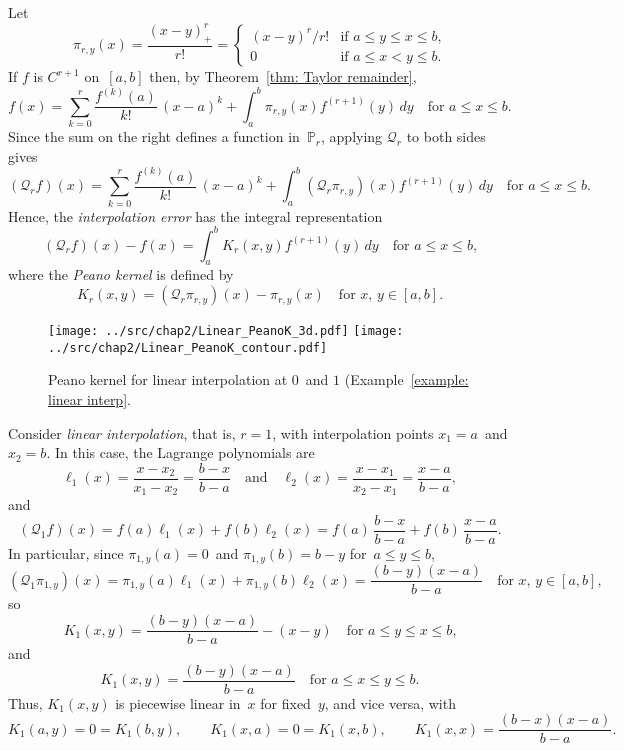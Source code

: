 Let 
\begin{equation}\label{eq: pi r y}
\pi_{r,y}(x)=\frac{(x-y)_+^r}{r!}=\begin{cases}
	(x-y)^r/r!&\text{if $a\le y\le x\le b$,}\\
	0&\text{if $a\le x<y\le b$.}
\end{cases}
\end{equation}
If $f$ is $C^{r+1}$ on~$[a,b]$ then, by Theorem~\ref{thm: Taylor remainder}, 
\[
f(x)=\sum_{k=0}^r\frac{f^{(k)}(a)}{k!}\,(x-a)^k
	+\int_a^b\pi_{r,y}(x)f^{(r+1)}(y)\,dy\quad\text{for $a\le x\le b$.}
\]
Since the sum on the right defines a function in~$\mathbb{P}_r$,
applying $\mathcal{Q}_r$ to both sides gives
\[
(\mathcal{Q}_rf)(x)=\sum_{k=0}^r\frac{f^{(k)}(a)}{k!}\,(x-a)^k
	+\int_a^b(\mathcal{Q}_r\pi_{r,y})(x)f^{(r+1)}(y)\,dy
\quad\text{for $a\le x\le b$.}
\]
Hence, the \emph{interpolation error} has the integral representation
\begin{equation}\label{eq: Qr f error}
(\mathcal{Q}_rf)(x)-f(x)=\int_a^b K_r(x,y)f^{(r+1)}(y)\,dy
\quad\text{for $a\le x\le b$,}
\end{equation}
where the \emph{Peano kernel} is defined by
\[
K_r(x,y)=(\mathcal{Q}_r\pi_{r,y})(x)-\pi_{r,y}(x)
	\quad\text{for $x$, $y\in[a,b]$.}
\]

\begin{figure}
\caption{Peano kernel for linear interpolation at $0$~and $1$
(Example~\ref{example: linear interp}.}
\label{fig: linear Peano}
\begin{center}
\texttt{[image: ../src/chap2/Linear\_PeanoK\_3d.pdf]}
\texttt{[image: ../src/chap2/Linear\_PeanoK\_contour.pdf]}
\end{center}
\end{figure}

\begin{example}\label{example: linear interp}
Consider \emph{linear interpolation}, that is, $r=1$, with interpolation points 
$x_1=a$~and $x_2=b$.  In this case, the Lagrange polynomials are
\[
\ell_1(x)=\frac{x-x_2}{x_1-x_2}=\frac{b-x}{b-a}
\quad\text{and}\quad
\ell_2(x)=\frac{x-x_1}{x_2-x_1}=\frac{x-a}{b-a},
\]
and
\[
(\mathcal{Q}_1f)(x)=f(a)\ell_1(x)+f(b)\ell_2(x)
	=f(a)\,\frac{b-x}{b-a}+f(b)\,\frac{x-a}{b-a}.
\]
In particular, since $\pi_{1,y}(a)=0$~and $\pi_{1,y}(b)=b-y$ for~$a\le y\le b$,
\[
(\mathcal{Q}_1\pi_{1,y})(x)=\pi_{1,y}(a)\ell_1(x)+\pi_{1,y}(b)\ell_2(x)
	=\frac{(b-y)(x-a)}{b-a}\quad\text{for $x$, $y\in[a,b]$,}
\]
so
\[
K_1(x,y)=\frac{(b-y)(x-a)}{b-a}-(x-y)\quad\text{for $a\le y\le x\le b$,}
\]
and
\[
K_1(x,y)=\frac{(b-y)(x-a)}{b-a}\quad\text{for $a\le x\le y\le b$.}
\]
Thus, $K_1(x,y)$ is piecewise linear in~$x$ for fixed~$y$, and vice versa, with
\[
K_1(a,y)=0=K_1(b,y),\qquad K_1(x,a)=0=K_1(x,b),\qquad
K_1(x,x)=\frac{(b-x)(x-a)}{b-a}.
\]
\end{example}

